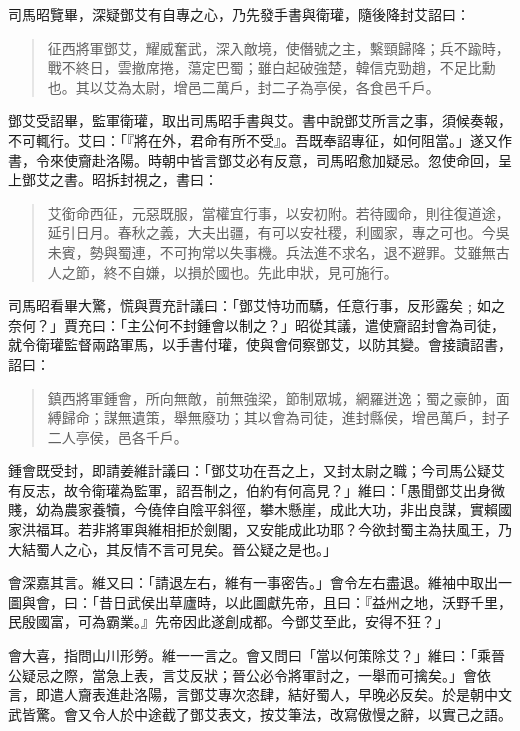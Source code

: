 司馬昭覽畢，深疑鄧艾有自專之心，乃先發手書與衛瓘，隨後降封艾詔曰：

\begin{quote}
征西將軍鄧艾，耀威奮武，深入敵境，使僭號之主，繫頸歸降；兵不踰時，戰不終日，雲撤席捲，蕩定巴蜀；雖白起破強楚，韓信克勁趙，不足比勳也。其以艾為太尉，增邑二萬戶，封二子為亭侯，各食邑千戶。
\end{quote}

鄧艾受詔畢，監軍衛瓘，取出司馬昭手書與艾。書中說鄧艾所言之事，須候奏報，不可輒行。艾曰：「『將在外，君命有所不受』。吾既奉詔專征，如何阻當。」遂又作書，令來使齎赴洛陽。時朝中皆言鄧艾必有反意，司馬昭愈加疑忌。忽使命回，呈上鄧艾之書。昭拆封視之，書曰：

\begin{quote}
艾銜命西征，元惡既服，當權宜行事，以安初附。若待國命，則往復道途，延引日月。春秋之義，大夫出疆，有可以安社稷，利國家，專之可也。今吳未賓，勢與蜀連，不可拘常以失事機。兵法進不求名，退不避罪。艾雖無古人之節，終不自嫌，以損於國也。先此申狀，見可施行。
\end{quote}

司馬昭看畢大驚，慌與賈充計議曰：「鄧艾恃功而驕，任意行事，反形露矣﹔如之奈何？」賈充曰：「主公何不封鍾會以制之？」昭從其議，遣使齎詔封會為司徒，就令衛瓘監督兩路軍馬，以手書付瓘，使與會伺察鄧艾，以防其變。會接讀詔書，詔曰：

\begin{quote}
鎮西將軍鍾會，所向無敵，前無強梁，節制眾城，網羅迸逸；蜀之豪帥，面縛歸命；謀無遺策，舉無廢功；其以會為司徒，進封縣侯，增邑萬戶，封子二人亭侯，邑各千戶。
\end{quote}

鍾會既受封，即請姜維計議曰：「鄧艾功在吾之上，又封太尉之職；今司馬公疑艾有反志，故令衛瓘為監軍，詔吾制之，伯約有何高見？」維曰：「愚聞鄧艾出身微賤，幼為農家養犢，今僥倖自陰平斜徑，攀木懸崖，成此大功，非出良謀，實賴國家洪福耳。若非將軍與維相拒於劍閣，又安能成此功耶？今欲封蜀主為扶風王，乃大結蜀人之心，其反情不言可見矣。晉公疑之是也。」

會深嘉其言。維又曰：「請退左右，維有一事密告。」會令左右盡退。維袖中取出一圖與會，曰：「昔日武侯出草廬時，以此圖獻先帝，且曰：『益州之地，沃野千里，民殷國富，可為霸業。』先帝因此遂創成都。今鄧艾至此，安得不狂？」

會大喜，指問山川形勞。維一一言之。會又問曰「當以何策除艾？」維曰：「乘晉公疑忌之際，當急上表，言艾反狀；晉公必令將軍討之，一舉而可擒矣。」會依言，即遣人齎表進赴洛陽，言鄧艾專次恣肆，結好蜀人，早晚必反矣。於是朝中文武皆驚。會又令人於中途截了鄧艾表文，按艾筆法，改寫傲慢之辭，以實己之語。

